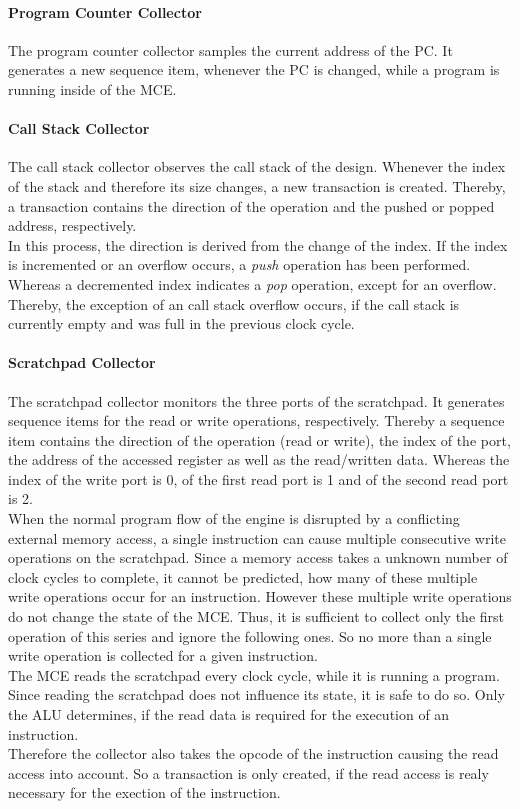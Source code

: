 \paragraph{Program Counter Collector}

The program counter collector samples the current address of the PC.
It generates a new sequence item, whenever the PC is changed, while a program is running inside of the MCE.

\paragraph{Call Stack Collector}

The call stack collector observes the call stack of the design.
Whenever the index of the stack and therefore its size changes, a new transaction is created.
Thereby, a transaction contains the direction of the operation and the pushed or popped address, respectively.\\
In this process, the direction is derived from the change of the index.
If the index is incremented or an overflow occurs, a \emph{push} operation has been performed.
Whereas a decremented index indicates a \emph{pop} operation, except for an overflow.
Thereby, the exception of an call stack overflow occurs, if the call stack is currently empty and was full in the previous clock cycle.

\paragraph{Scratchpad Collector}

The scratchpad collector monitors the three ports of the scratchpad.
It generates sequence items for the read or write operations, respectively.
Thereby a sequence item contains the direction of the operation (read or write), the index of the port, the address of the accessed register as well as the read/written data.
Whereas the index of the write port is 0, of the first read port is 1 and of the second read port is 2.\\
When the normal program flow of the engine is disrupted by a conflicting external memory access, a single instruction can cause multiple consecutive write operations on the scratchpad. 
Since a memory access takes a unknown number of clock cycles to complete, it cannot be predicted, how many of these multiple write operations occur for an instruction.
However these multiple write operations do not change the state of the MCE.
Thus, it is sufficient to collect only the first operation of this series and ignore the following ones.
So no more than a single write operation is collected for a given instruction.\\
The MCE reads the scratchpad every clock cycle, while it is running a program.
Since reading the scratchpad does not influence its state, it is safe to do so.
Only the ALU determines, if the read data is required for the execution of an instruction.\\
Therefore the collector also takes the opcode of the instruction causing the read access into account.
So a transaction is only created, if the read access is realy necessary for the exection of the instruction.

